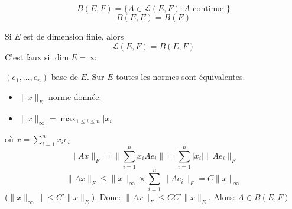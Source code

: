 \begin{notation}
   \[
       B(E, F) = \{ A \in \mathcal{L}(E, F): A \text{ continue } \}
   \]  
   \[
   B(E, E) = B(E)
   \] 
\end{notation}
\begin{lemma}
   Si $E$ est de dimension finie, alors
   \[
       \mathcal{L}(E, F) = B(E, F)
   \] 
   C'est faux si $\dim E = \infty$
\end{lemma}
\begin{preuve}
    $(e_1, \ldots, e_n)$ base de $E$. Sur  $E$ toutes les normes sont équivalentes.  
    \begin{itemize}
        \item $\|x\|_E$ norme donnée.        
        \item $\|x\|_{\infty} = \max_{1 \le i \le n} |x_i|$ 
    \end{itemize}
    où $x = \sum_{i=1}^{n} x_ie_i$ 
    \[
    \|Ax\|_F = \|\sum_{i=1}^{n} x_iAe_i\| = \sum_{i=1}^{n} |x_i|\|Ae_i\|_F
    \] 
    \[
    \|Ax\|_F \le \|x\|_{\infty} \times \sum_{i=1}^{n} \|Ae_i\|_F = C\|x\|_{\infty}
    \] 
    ($\|x\|_{\infty}\| \le C'\|x\|_{E}$). Donc: $\|Ax\|_{F} \le CC'\|x\|_E$. Alors: $A \in B(E, F)$
\end{preuve}

